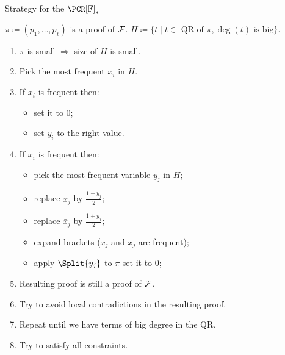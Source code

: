 \begin{frame}{Strategy for the $\PCR[\field]_*$}

    $\pi \coloneqq (p_1, \dots, p_{\ell})$ is a proof of $\mathcal{F}$. $H \coloneqq \{t \mid t \in \text{ QR of }
    \pi, \deg(t) \text{ is big}\}$.

    \begin{enumerate}
        \item $\pi$ is small $\Rightarrow$ size of $H$ is small.
        \pause
        \item Pick the most frequent  $x_i$ in $H$.
        \pause
        \item If $x_i$ is frequent then:
            \begin{itemize}
                \item set it to $0$;
                \item set $y_i$ to the right value.
            \end{itemize}
        \pause
        \item If $x_i$ is  frequent then:
            \begin{itemize}
                \item pick the most frequent variable $y_j$ in $H$;
                \item replace $x_j$ by $\frac{1 - y_j}{2}$;
                \item replace $\bar{x}_j$ by $\frac{1 + y_j}{2}$;
                \item expand brackets ($x_j$ and $\bar{x}_j$ are  frequent);
                \item apply $\Split{y_j}$ to $\pi$ set it to $0$;
            \end{itemize}
        \item Resulting proof is still a proof of  $\mathcal{F}$.
        \pause
        \item Try to avoid local contradictions in the resulting proof. 
        \pause
        \item Repeat until we have terms of big degree in the QR.
        \vspace{0.3cm}
        \pause
        \item Try to satisfy all  constraints.
    \end{enumerate}
\end{frame}